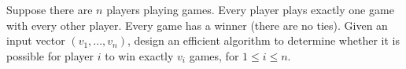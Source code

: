 \problem{}
Suppose there are $n$ players playing games. Every player plays exactly one game with every other player.  Every game has a winner (there are no ties).  Given an input vector $(v_1, ..., v_n)$, design an efficient algorithm to determine whether it is possible for player $i$ to win exactly $v_i$ games, for $1 \leq i \leq n$.

\solution{

}

\newpage